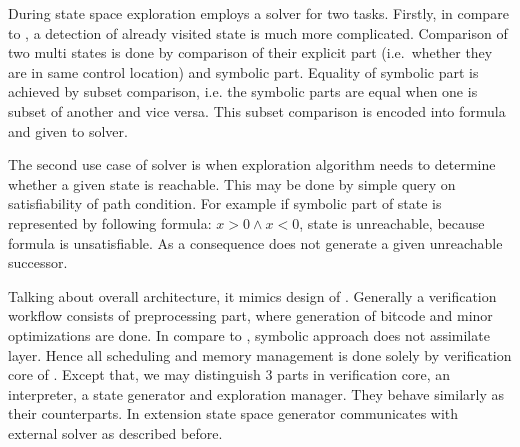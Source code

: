 During state space exploration \SymDIVINE employs a \SMT solver for two tasks.
Firstly, in compare to \DIVINE, a detection of already visited state is much
more complicated. Comparison of two multi states is done by comparison of their
explicit part (i.e.~whether they are in same control location) and symbolic
part. Equality of symbolic part is achieved by subset comparison, i.e. the
symbolic parts are equal when one is subset of another and vice versa.
This subset comparison is encoded into \SMT formula and given to
\SMT solver.

The second use case of \SMT solver is when exploration algorithm needs to
determine whether a given state is reachable. This may be done by simple query
on satisfiability of path condition. For example if symbolic part of state is
represented by following formula: $x > 0 \wedge x < 0$, state is unreachable,
because formula is unsatisfiable. As a consequence \SymDIVINE does
not generate a given unreachable successor.

Talking about \SymDIVINE overall architecture, it mimics design of \DIVINE.
Generally a verification workflow consists of preprocessing part, where
generation of \LLVM bitcode and minor optimizations are done. In compare to
\DIVINE, symbolic approach does not assimilate \DIOS layer. Hence all scheduling
and memory management is done solely by verification core of \SymDIVINE. Except
that, we may distinguish 3 parts in verification core, an interpreter, a state
generator and exploration manager. They behave similarly as their \DIVINE
counterparts. In extension state space generator communicates with external
\SMT solver as described before.

